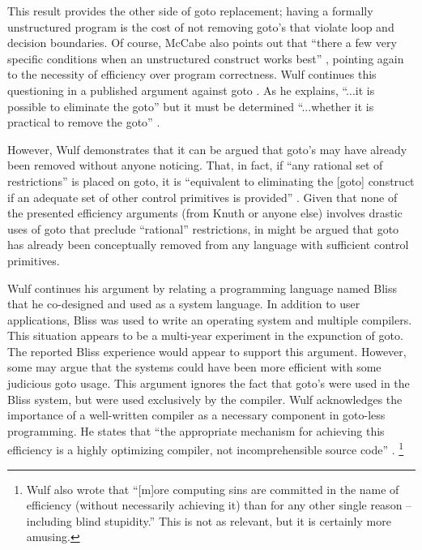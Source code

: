 \documentclass[letterpaper,10pt,twocolumn]{article}
\begin{document}
This result provides the other side of goto replacement; having a formally
unstructured program is the cost of not removing goto's that violate loop
and decision boundaries.  Of course, McCabe also points out that ``there a few
very specific conditions when an unstructured construct works best'' \cite{mccabe},
pointing again to the necessity of efficiency over program correctness.
Wulf continues this questioning in a published argument against goto \cite{wulf}.
As he explains,
``...it is possible to eliminate the goto'' but it must be determined
``...whether it is practical to remove the goto'' \cite{wulf}.

However, Wulf demonstrates that it can be argued that goto's may have already
been removed without anyone noticing. That, in fact, if ``any rational
set of restrictions'' is placed on goto, it is ``equivalent to eliminating the [goto]
construct if an adequate set of other control primitives is provided'' \cite{wulf}.
Given that none of the presented efficiency arguments (from Knuth
or anyone else) involves drastic uses of goto that preclude ``rational''
restrictions, in might be argued that goto has already been conceptually
removed from any language with sufficient control primitives.

\label{wulf-bliss-compiler}
Wulf continues his argument by relating a programming language named Bliss that
he co-designed and used as a system language.  In addition to user applications,
Bliss was used to write an operating system and multiple compilers.  This situation
appears to be a multi-year experiment in the expunction of goto.  The
reported Bliss experience would appear to support this argument.  However, some
may argue that the systems could have been more efficient with some judicious
goto usage.  This argument ignores the fact that goto's were
used in the Bliss system, but were used exclusively by the compiler.
Wulf acknowledges the importance of a well-written compiler as a necessary
component in goto-less programming.  He states that ``the appropriate
mechanism for achieving this efficiency is a highly optimizing compiler, not
incomprehensible source code'' \cite{wulf}.
\footnote{Wulf also wrote that ``[m]ore computing sins are committed in the
name of efficiency (without necessarily achieving it) than for any other single
reason -- including blind stupidity.'' \cite{wulf}  This is not as relevant,
but it is certainly more amusing.}


\end{document}
